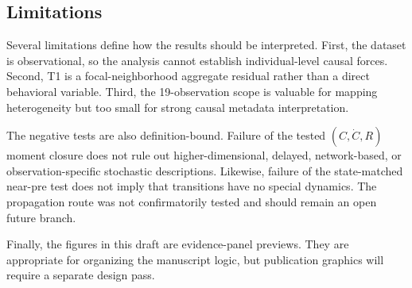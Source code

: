 \subsection{Limitations}

Several limitations define how the results should be interpreted. First, the
dataset is observational, so the analysis cannot establish individual-level
causal forces. Second, T1 is a focal-neighborhood aggregate residual rather
than a direct behavioral variable. Third, the 19-observation scope is valuable
for mapping heterogeneity but too small for strong causal metadata
interpretation.

The negative tests are also definition-bound. Failure of the tested
$(C,\dot{C},R)$ moment closure does not rule out higher-dimensional,
delayed, network-based, or observation-specific stochastic descriptions.
Likewise, failure of the state-matched near-pre test does not imply that
transitions have no special dynamics. The propagation route was not
confirmatorily tested and should remain an open future branch.

Finally, the figures in this draft are evidence-panel previews. They are
appropriate for organizing the manuscript logic, but publication graphics will
require a separate design pass.

